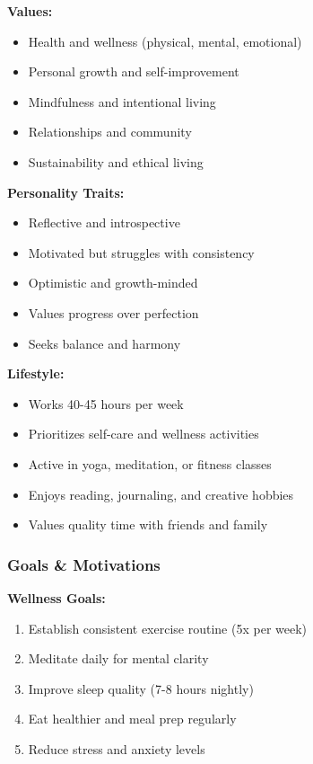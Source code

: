 \textbf{Values:}
\begin{itemize}
    \item Health and wellness (physical, mental, emotional)
    \item Personal growth and self-improvement
    \item Mindfulness and intentional living
    \item Relationships and community
    \item Sustainability and ethical living
\end{itemize}

\textbf{Personality Traits:}
\begin{itemize}
    \item Reflective and introspective
    \item Motivated but struggles with consistency
    \item Optimistic and growth-minded
    \item Values progress over perfection
    \item Seeks balance and harmony
\end{itemize}

\textbf{Lifestyle:}
\begin{itemize}
    \item Works 40-45 hours per week
    \item Prioritizes self-care and wellness activities
    \item Active in yoga, meditation, or fitness classes
    \item Enjoys reading, journaling, and creative hobbies
    \item Values quality time with friends and family
\end{itemize}

\subsubsection{Goals \& Motivations}

\textbf{Wellness Goals:}
\begin{enumerate}
    \item Establish consistent exercise routine (5x per week)
    \item Meditate daily for mental clarity
    \item Improve sleep quality (7-8 hours nightly)
    \item Eat healthier and meal prep regularly
    \item Reduce stress and anxiety levels
\end{enumerate}

